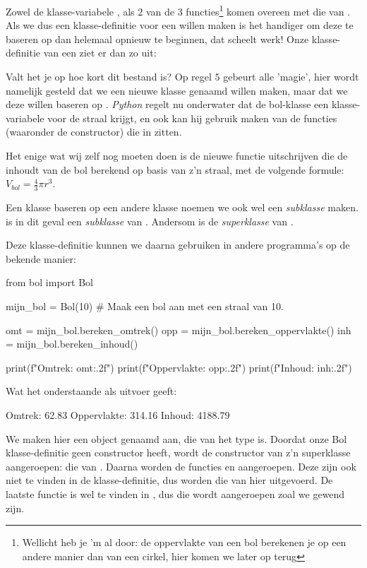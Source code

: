 Zowel de klasse-variabele , als $2$ van de $3$ functies\footnote{Wellicht heb je 'm al door: de oppervlakte van een bol berekenen je op een andere manier dan van een cirkel, hier komen we later op terug} komen overeen met die van . Als we dus een klasse-definitie voor een  willen maken is het handiger om deze te baseren op  dan helemaal opnieuw te beginnen, dat scheelt werk! Onze klasse-definitie van een  ziet er dan zo uit:


Valt het je op hoe kort dit bestand is? Op regel $5$ gebeurt alle 'magie', hier wordt namelijk gesteld dat we een nieuwe klasse genaamd  willen maken, maar dat we deze willen baseren op . \textit{Python} regelt nu onderwater dat de bol-klasse een klasse-variabele  voor de straal krijgt, en ook kan hij gebruik maken van de functies (waaronder de constructor) die in  zitten. 

Het enige wat wij zelf nog moeten doen is de nieuwe functie uitschrijven die de inhoudt van de bol berekend op basis van z'n straal, met de volgende formule: $V_{bol} = \frac{4}{3} \pi r^3$. 

\begin{remark}
  Een klasse baseren op een andere klasse noemen we ook wel een \textit{subklasse} maken.  is in dit geval een \textit{subklasse} van . Andersom is  de \textit{superklasse} van .
\end{remark}

Deze klasse-definitie kunnen we daarna gebruiken in andere programma's op de bekende manier:
\begin{python}
from bol import Bol

mijn_bol = Bol(10)  # Maak een bol aan met een straal van 10.

omt = mijn_bol.bereken_omtrek()
opp = mijn_bol.bereken_oppervlakte()
inh = mijn_bol.bereken_inhoud()

print(f"Omtrek: {omt:.2f}")
print(f"Oppervlakte: {opp:.2f}")
print(f"Inhoud: {inh:.2f}")
\end{python}

Wat het onderstaande als uitvoer geeft:
\begin{python}
Omtrek: 62.83
Oppervlakte: 314.16
Inhoud: 4188.79
\end{python}

We maken hier een object genaamd  aan, die van het type  is. Doordat onze Bol klasse-definitie geen constructor heeft, wordt de constructor van z'n superklasse aangeroepen: die van . Daarna worden de functies  en  aangeroepen. Deze zijn ook niet te vinden in de  klasse-definitie, dus worden die van  hier uitgevoerd. De laatste functie  is wel te vinden in , dus die wordt aangeroepen zoal we gewend zijn. 

